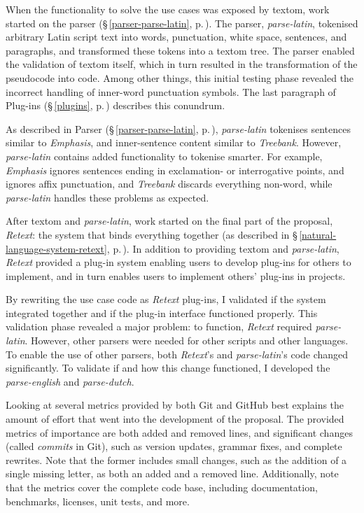 When the functionality to solve the use cases was exposed by \gls{textom},
  work started on the parser (§\,\ref{parser-parse-latin},
  p.\,\pageref{parser-parse-latin}).
The parser, \emph{parse-latin}, tokenised arbitrary Latin script text into
  words, punctuation, white space, sentences, and paragraphs, and transformed
  these tokens into a \gls{textom} tree.
The parser enabled the validation of \gls{textom} itself, which in turn
  resulted in the transformation of the pseudocode into code.
Among other things, this initial testing phase revealed the incorrect
  handling of inner-word punctuation symbols.
The last paragraph of Plug-ins (§\,\ref{plugins}, p.\,\pageref{plugins})
  describes this conundrum.

As described in Parser (§\,\ref{parser-parse-latin},
  p.\,\pageref{parser-parse-latin}), \emph{parse-latin} tokenises sentences
  similar to \emph{Emphasis}, and inner-sentence content similar to
  \emph{Treebank}.
However, \emph{parse-latin} contains added functionality to tokenise smarter.
For example, \emph{Emphasis} ignores sentences ending in exclamation- or
  interrogative points, and ignores affix punctuation, and \emph{Treebank}
  discards everything non-word, while \emph{parse-latin} handles these
  problems as expected.

After \gls{textom} and \emph{parse-latin}, work started on the final
  part of the proposal, \emph{Retext}: the system that binds everything
  together (as described in §\,\ref{natural-language-system-retext},
  p.\,\pageref{natural-language-system-retext}).
In addition to providing \gls{textom} and \emph{parse-latin}, \emph{Retext}
  provided a plug-in system enabling users to develop plug-ins for others
  to implement, and in turn enables users to implement others' plug-ins
  in projects.

By rewriting the use case code as \emph{Retext} plug-ins, I validated if
  the system integrated together and if the plug-in interface functioned
  properly.
This validation phase revealed a major problem: to function, \emph{Retext}
  required \emph{parse-latin}.
However, other parsers were needed for other scripts and other languages.
To enable the use of other parsers, both \emph{Retext}'s and
  \emph{parse-latin}'s code changed significantly.
To validate if and how this change functioned, I developed the
  \emph{parse-english} and \emph{parse-dutch}.

\medskip\noindent Looking at several metrics provided by both Git and
  GitHub best explains the amount of effort that went into the development
  of the proposal.
The provided metrics of importance are both added and removed lines, and
  significant changes (called \emph{commits} in Git), such as version
  updates, grammar fixes, and complete rewrites.
Note that the former includes small changes, such as the addition of a single
  missing letter, as both an added and a removed line.
Additionally, note that the metrics cover the complete code base, including
  documentation, benchmarks, licenses, unit tests, and more.

